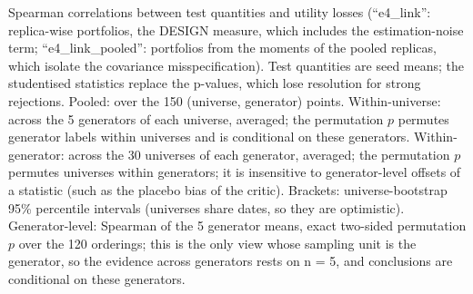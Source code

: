 Spearman correlations between test quantities and utility losses (``e4\_link'': replica-wise portfolios, the DESIGN measure, which includes the estimation-noise term; ``e4\_link\_pooled'': portfolios from the moments of the pooled replicas, which isolate the covariance misspecification). Test quantities are seed means; the studentised statistics replace the p-values, which lose resolution for strong rejections. Pooled: over the 150 (universe, generator) points. Within-universe: across the 5 generators of each universe, averaged; the permutation $p$ permutes generator labels within universes and is conditional on these generators. Within-generator: across the 30 universes of each generator, averaged; the permutation $p$ permutes universes within generators; it is insensitive to generator-level offsets of a statistic (such as the placebo bias of the critic). Brackets: universe-bootstrap 95\% percentile intervals (universes share dates, so they are optimistic). Generator-level: Spearman of the 5 generator means, exact two-sided permutation $p$ over the 120 orderings; this is the only view whose sampling unit is the generator, so the evidence across generators rests on n = 5, and conclusions are conditional on these generators.
